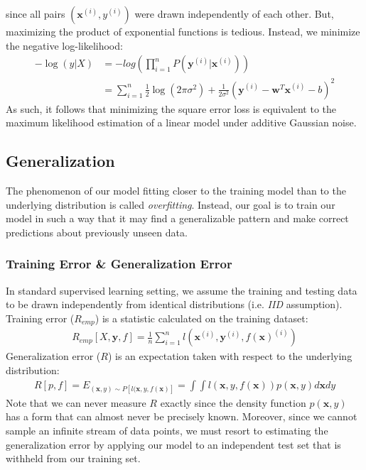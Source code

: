 \documentclass[a4paper,12pt]{article}
\theoremstyle{definition}
\begin{document}
    since all pairs $(\mathbf{x}^{(i)},y^{(i)})$ were drawn independently of each other. But, maximizing the product of exponential
    functions is tedious. Instead, we minimize the negative log-likelihood:
    \begin{equation*}
        \begin{aligned}
            -\log(y|X) &= -log(\prod_{i=1}^{n}P(\mathbf{y}^{(i)}|\mathbf{x}^{(i)})) \\
                       &= \sum_{i=1}^{n} \frac{1}{2}\log(2\pi\sigma^2) + \frac{1}{2\sigma^2}(\mathbf{y}^{(i)}-\mathbf{w}^T\mathbf{x}^{(i)} - b)^2
        \end{aligned}
    \end{equation*}
    As such, it follows that minimizing the square error loss is equivalent to the maximum likelihood estimation of a linear model 
    under additive Gaussian noise.

\subsection*{Generalization}
    The phenomenon of our model fitting closer to the training model than to the underlying distribution is called \textit{overfitting}.
    Instead, our goal is to train our model in such a way that it may find a generalizable pattern and make correct
    predictions about previously unseen data.
    \subsubsection*{Training Error \& Generalization Error}
    In standard supervised learning setting, we assume the training and testing data to be drawn independently from
    identical distributions (i.e. \textit{IID} assumption).
    Training error ($R_{emp}$) is a statistic calculated on the training dataset:
    \begin{equation*}
        \begin{aligned}
           R_{emp}[X,\mathbf{y},f] = \frac{1}{n}\sum_{i=1}^{n}l(\mathbf{x}^{(i)},\mathbf{y}^{(i)},f(\mathbf{x})^{(i)})
        \end{aligned}
    \end{equation*}
    Generalization error ($R$) is an expectation taken with respect to the underlying distribution:
    \begin{equation*}
        \begin{aligned}
           R[p,f] = E_{(\mathbf{x},y)\sim P[l(\mathbf{x},y,f(\mathbf{x})]} = \int\int l(\mathbf{x},y,f(\mathbf{x}))p(\mathbf{x},y)d\mathbf{x}dy
         \end{aligned}
    \end{equation*}
    Note that we can never measure $R$ exactly since the density function $p(\mathbf{x},y)$ has a form that can almost never
    be precisely known. Moreover, since we cannot sample an infinite stream of data points, we must resort to estimating
    the generalization error by applying our model to an independent test set that is withheld from our training set.
\end{document}
